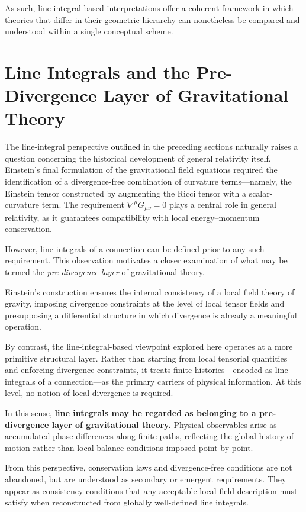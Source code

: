 \documentclass[12pt,letterpaper]{article} %
\begin{document}
As such, line-integral-based interpretations offer a coherent framework in which theories that differ in their geometric hierarchy can nonetheless be compared and understood within a single conceptual scheme.

\section{Line Integrals and the Pre-Divergence Layer of Gravitational Theory}

\justifying
The line-integral perspective outlined in the preceding sections naturally raises a question concerning the historical development of general relativity itself. Einstein's final formulation of the gravitational field equations required the identification of a divergence-free combination of curvature terms—namely, the Einstein tensor constructed by augmenting the Ricci tensor with a scalar-curvature term. The requirement $\nabla^\mu G_{\mu\nu} = 0$ plays a central role in general relativity, as it guarantees compatibility with local energy--momentum conservation.

However, line integrals of a connection can be defined prior to any such requirement. This observation motivates a closer examination of what may be termed the \emph{pre-divergence layer} of gravitational theory.

Einstein's construction ensures the internal consistency of a local field theory of gravity, imposing divergence constraints at the level of local tensor fields and presupposing a differential structure in which divergence is already a meaningful operation.

By contrast, the line-integral-based viewpoint explored here operates at a more primitive structural layer.  
Rather than starting from local tensorial quantities and enforcing divergence constraints, it treats finite histories—encoded as line integrals of a connection—as the primary carriers of physical information.  
At this level, no notion of local divergence is required.

In this sense, \textbf{line integrals may be regarded as belonging to a pre-divergence layer of gravitational theory.} Physical observables arise as accumulated phase differences along finite paths, reflecting the global history of motion rather than local balance conditions imposed point by point.

From this perspective, conservation laws and divergence-free conditions are not abandoned, but are understood as secondary or emergent requirements. They appear as consistency conditions that any acceptable local field description must satisfy when reconstructed from globally well-defined line integrals.
\end{document}
